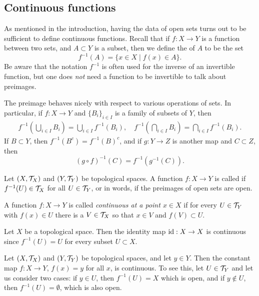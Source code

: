 \subsection{Continuous functions}
As mentioned in the introduction, having the data of open sets turns out to be sufficient to define continuous functions. Recall that if $f : X \to Y$ is a function between two sets, and $A \subset Y$ is a subset, then we define the  of $A$ to be the set
\[
  f^{-1}(A) = \{ x \in X \mid f(x) \in A \}.
\]
Be aware that the notation $f^{-1}$ is often used for the inverse of an invertible function, but one does \emph{not} need a function to be invertible to talk about preimages.

\begin{prop}
  \label{preimage-props}
  The preimage behaves nicely with respect to various operations of sets. In particular, if $f : X \to Y$ and $\{B_i\}_{i \in I}$ is a family of subsets of $Y$, then
  \begin{align*}
    f^{-1}\left( \bigcup_{i \in I} B_i \right) = \bigcup_{i \in I} f^{-1}(B_i), \quad f^{-1}\left( \bigcap_{i \in I} B_i \right) = \bigcap_{i \in I} f^{-1}(B_i).
  \end{align*}
  If $B \subset Y$, then $f^{-1}(B^c) = f^{-1}(B)^c$, and if $g : Y \to Z$ is another map and $C \subset Z$, then
  \[
    (g \circ f)^{-1}(C) = f^{-1}(g^{-1}(C)).
  \]
\end{prop}
\begin{defn}
  \label{continuity-def}
  Let $(X,\mathcal{T}_X)$ and $(Y,\mathcal{T}_Y)$ be topological spaces. A function $f : X \to Y$ is called  if $f^{-1}(U) \in \mathcal{T}_X$ for all $U \in \mathcal{T}_Y$, or in words, if the preimages of open sets are open.
  
  A function $f : X \to Y$ is called \emph{continuous at a point $x \in X$} if for every $U \in \mathcal{T}_Y$ with $f(x) \in U$ there is a $V \in \mathcal{T}_X$ so that $x \in V$ and $f(V) \subset U$.
\end{defn}
\begin{example}
  Let $X$ be a topological space. Then the identity map $\mathrm{id} : X \to X$ is continuous since $f^{-1}(U) = U$ for every subset $U \subset X$.
\end{example}
\begin{example}
  Let $(X,\mathcal{T}_X)$ and $(Y,\mathcal{T}_Y)$ be topological spaces, and let $y \in Y$. Then the constant map $f : X \to Y$, $f(x) = y$ for all $x$, is continuous. To see this, let $U \in \mathcal{T}_Y$ and let us consider two cases: if $y \in U$, then $f^{-1}(U) = X$ which is open, and if $y \notin U$, then $f^{-1}(U) = \emptyset$, which is also open.
\end{example}
